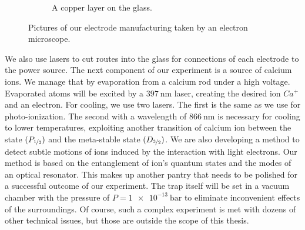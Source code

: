 \begin{figure}[H]
\begin{subfigure}{.465\textwidth}
	\caption{A copper layer on the glass.\\}
	\label{fig:quadrupole picture}
\end{subfigure}
\caption{Pictures of our electrode manufacturing taken by an electron microscope.}
\label{fig:trap manufacturing}
\end{figure}
We also use lasers to cut routes into the glass for connections of each electrode to the power source. The next component of our experiment is a source of calcium ions. We manage that by evaporation from a calcium rod under a high voltage. Evaporated atoms will be excited by a $\SI{397}{\nano\meter}$ laser, creating the desired ion $Ca^+$ and an electron. For cooling, we use two lasers. The first is the same as we use for photo-ionization. The second with a wavelength of $\SI{866}{\nano\meter}$ is necessary for cooling to lower temperatures, exploiting another transition of calcium ion between the state $(P_{\nicefrac{1}{2}})$ and the meta-stable state $(D_{\nicefrac{3}{2}})$. We are also developing a method to detect subtle motions of ions induced by the interaction with light electrons. Our method is based on the entanglement of ion's quantum states and the modes of an optical resonator. This makes up another pantry that needs to be polished for a successful outcome of our experiment. The trap itself will be set in a vacuum chamber with the pressure of $P = \SI{1e-13}{\bar}$ to eliminate inconvenient effects of the surroundings. Of course, such a complex experiment is met with dozens of other technical issues, but those are outside the scope of this thesis.